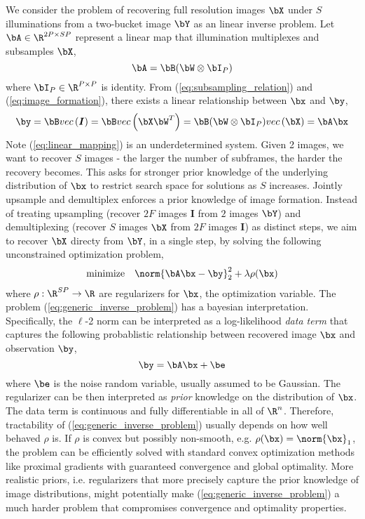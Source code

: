 \documentclass[11pt]{article}
\renewcommand{\vec}[1]{vec\left(#1\right)}
\renewcommand{\sI}{\boldsymbol{I}}
\newcommand{\minimize}{\text{minimize}\quad}
\begin{document}
We consider the problem of recovering full resolution images $\bX$ under $S$ illuminations from a two-bucket image $\bY$ as an linear inverse problem. Let $\bA \in \R^{2P\times SP}$ represent a linear map that illumination multiplexes and subsamples $\bX$,
\[
    \bA = \bB(\bW\otimes \bI_P)
\]
where $\bI_P\in\R^{P\times P}$ is identity. From (\ref{eq:subsampling_relation}) and (\ref{eq:image_formation}), there exists a linear relationship between $\bx$ and $\by$,
\begin{equation}
    \label{eq:linear_mapping}
    \by = \bB \vec{\sI} = \bB \vec{\bX \bW^T} = \bB(\bW \otimes \bI_P) \vec{\bX} = \bA\bx
\end{equation}
Note (\ref{eq:linear_mapping}) is an underdetermined system. Given 2 images, we want to recover $S$ images - the larger the number of subframes, the harder the recovery becomes. This asks for stronger prior knowledge of the underlying distribution of $\bx$ to restrict search space for solutions as $S$ increases. Jointly upsample and demultiplex enforces a prior knowledge of image formation. Instead of treating upsampling (recover $2F$ images $\sI$ from $2$ images $\bY$) and demultiplexing (recover $S$ images $\bX$ from $2F$ images $\sI$) as distinct steps, we aim to recover $\bX$ directy from $\bY$, in a single step, by solving the following unconstrained optimization problem,
\begin{equation}
    \label{eq:generic_inverse_problem}
    \begin{aligned}
        \minimize & \norm{\bA\bx - \by}_2^2 + \lambda\rho(\bx) \\
    \end{aligned}
\end{equation}
where $\rho:\R^{SP}\to\R$ are regularizers for $\bx$, the optimization variable. The problem (\ref{eq:generic_inverse_problem}) has a bayesian interpretation. Specifically, the $\ell$-2 norm can be interpreted as a log-likelihood \textit{data term} that captures the following probablistic relationship between recovered image $\bx$ and observation $\by$, 
\[
    \by = \bA\bx + \be    
\]
where $\be$ is the noise random variable, usually assumed to be Gaussian. The regularizer can be then interpreted as \textit{prior} knowledge on the distribution of $\bx$. The data term is continuous and fully differentiable in all of $\R^n$. Therefore, tractability of (\ref{eq:generic_inverse_problem}) usually depends on how well behaved $\rho$ is. If $\rho$ is convex but possibly non-smooth, e.g. $\rho(\bx)=\norm{\bx}_1$, the problem can be efficiently solved with standard convex optimization methods like proximal gradients with guaranteed convergence and global optimality.\cite{beckFastIterativeShrinkageThresholding2009} More realistic priors, i.e. regularizers that more precisely capture the prior knowledge of image distributions, might potentially make (\ref{eq:generic_inverse_problem}) a much harder problem that compromises convergence and optimality properties.\cite{ulyanovDeepImagePrior2017}
\end{document}
